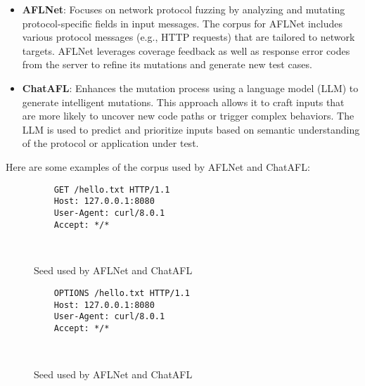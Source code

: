 \begin{itemize}
    \item \textbf{AFLNet}: Focuses on network protocol fuzzing by analyzing and mutating protocol-specific fields in input messages. The corpus for AFLNet includes various protocol messages (e.g., HTTP requests) that are tailored to network targets. AFLNet leverages coverage feedback as well as response error codes from the server to refine its mutations and generate new test cases.

    \item \textbf{ChatAFL}: Enhances the mutation process using a language model (LLM) to generate intelligent mutations. This approach allows it to craft inputs that are more likely to uncover new code paths or trigger complex behaviors. The LLM is used to predict and prioritize inputs based on semantic understanding of the protocol or application under test.
\end{itemize}

Here are some examples of the corpus used by AFLNet and ChatAFL:
\begin{figure}[H]
    \centering
    \begin{adjustbox}{valign=t}
    \begin{lstlisting}
    GET /hello.txt HTTP/1.1
    Host: 127.0.0.1:8080
    User-Agent: curl/8.0.1
    Accept: */*
        
            
    \end{lstlisting}
    \end{adjustbox}
    \caption{Seed used by AFLNet and ChatAFL}
\end{figure}

\begin{figure}[H]
    \centering
    \begin{adjustbox}{valign=t}
    \begin{lstlisting}
    OPTIONS /hello.txt HTTP/1.1
    Host: 127.0.0.1:8080
    User-Agent: curl/8.0.1
    Accept: */*

    
    \end{lstlisting}
    \end{adjustbox}
    \caption{Seed used by AFLNet and ChatAFL}
\end{figure}


